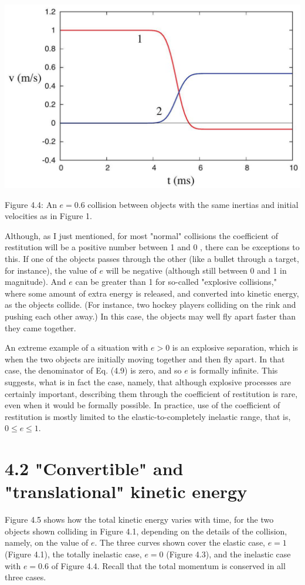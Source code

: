 \documentclass[10pt]{article}
\begin{document}
\begin{center}
\includegraphics[max width=\textwidth]{2024_09_14_9969b06773f10b6936e8g-093}
\end{center}

Figure 4.4: An $e=0.6$ collision between objects with the same inertias and initial velocities as in Figure 1.

Although, as I just mentioned, for most "normal" collisions the coefficient of restitution will be a positive number between 1 and 0 , there can be exceptions to this. If one of the objects passes through the other (like a bullet through a target, for instance), the value of $e$ will be negative (although still between 0 and 1 in magnitude). And $e$ can be greater than 1 for so-called "explosive collisions," where some amount of extra energy is released, and converted into kinetic energy, as the objects collide. (For instance, two hockey players colliding on the rink and pushing each other away.) In this case, the objects may well fly apart faster than they came together.

An extreme example of a situation with $e>0$ is an explosive separation, which is when the two objects are initially moving together and then fly apart. In that case, the denominator of Eq. (4.9) is zero, and so $e$ is formally infinite. This suggests, what is in fact the case, namely, that although explosive processes are certainly important, describing them through the coefficient of restitution is rare, even when it would be formally possible. In practice, use of the coefficient of restitution is mostly limited to the elastic-to-completely inelastic range, that is, $0 \leq e \leq 1$.

\section*{4.2 "Convertible" and "translational" kinetic energy}
Figure 4.5 shows how the total kinetic energy varies with time, for the two objects shown colliding in Figure 4.1, depending on the details of the collision, namely, on the value of $e$. The three curves shown cover the elastic case, $e=1$ (Figure 4.1), the totally inelastic case, $e=0$ (Figure 4.3), and the inelastic case with $e=0.6$ of Figure 4.4. Recall that the total momentum is conserved in all three cases.
\end{document}

